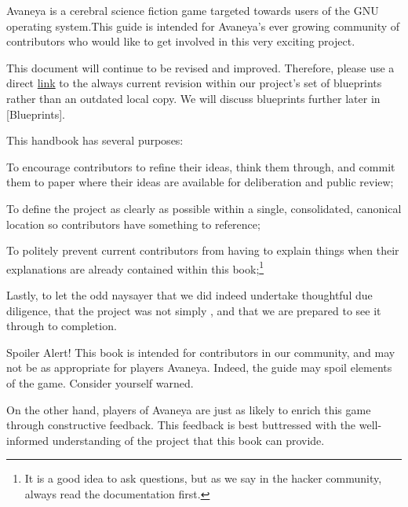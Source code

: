 

Avaneya is a cerebral science fiction game targeted towards users of the GNU operating system. This guide is intended for Avaneya's ever growing community of contributors who would like to get involved in this very exciting project.

This document will continue to be revised and improved. Therefore, please use a direct \href{\LatestHandbookURL}{link} to the always current revision within our project's set of blueprints rather than an outdated local copy. We will discuss blueprints further later in [Blueprints].

This handbook has several purposes:

\startitemize[4]
\item
To encourage contributors to refine their ideas, think them through, and commit them to paper where their ideas are available for deliberation and public review;

\item
To define the project as clearly as possible within a single, consolidated, canonical location so contributors have something to reference;

\item
To politely prevent current contributors from having to explain things when their explanations are already contained within this book;\footnote[rtfm]{It is a good idea to ask questions, but as we say in the hacker community, always read the documentation first.}

\item
Lastly, to let the odd naysayer that we did indeed undertake thoughtful due diligence, that the project was not simply , and that we are prepared to see it through to completion.
\stopitemize

Spoiler Alert! This book is intended for contributors in our community, and may not be as appropriate for players Avaneya. Indeed, the guide may spoil elements of the game. Consider yourself warned. 

On the other hand, players of Avaneya are just as likely to enrich this game through constructive feedback. This feedback is best buttressed with the well-informed understanding of the project that this book can provide.

\StopChapter
